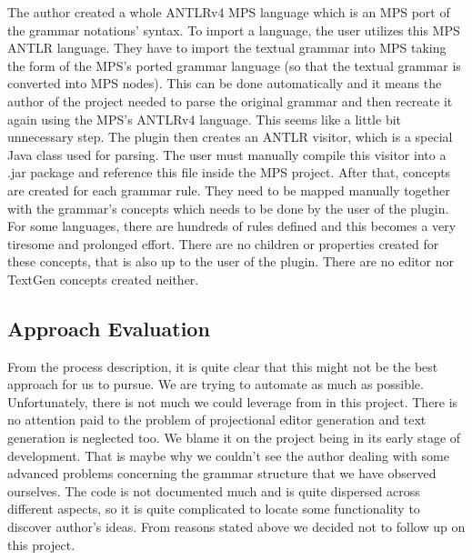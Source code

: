 The author created a whole ANTLRv4 MPS language which is an MPS port of the grammar notations' syntax.
To import a language, the user utilizes this MPS ANTLR language.
They have to import the textual grammar into MPS taking the form of the MPS's ported grammar language (so that the textual grammar is converted into MPS nodes).
This can be done automatically and it means the author of the project needed to parse the original grammar and then recreate it again using the MPS's ANTLRv4 language.
This seems like a little bit unnecessary step.
The plugin then creates an ANTLR visitor, which is a special Java class used for parsing.
The user must manually compile this visitor into a .jar package and reference this file inside the MPS project.
After that, concepts are created for each grammar rule.
They need to be mapped manually together with the grammar's concepts which needs to be done by the user of the plugin.
For some languages, there are hundreds of rules defined and this becomes a very tiresome and prolonged effort.
There are no children or properties created for these concepts, that is also up to the user of the plugin.
There are no editor nor TextGen concepts created neither.

\subsection{Approach Evaluation}
From the process description, it is quite clear that this might not be the best approach for us to pursue.
We are trying to automate as much as possible.
Unfortunately, there is not much we could leverage from in this project.
There is no attention paid to the problem of projectional editor generation and text generation is neglected too.
We blame it on the project being in its early stage of development.
That is maybe why we couldn't see the author dealing with some advanced problems concerning the grammar structure that we have observed ourselves.
The code is not documented much and is quite dispersed across different aspects, so it is quite complicated to locate some functionality to discover author's ideas.
From reasons stated above we decided not to follow up on this project.
